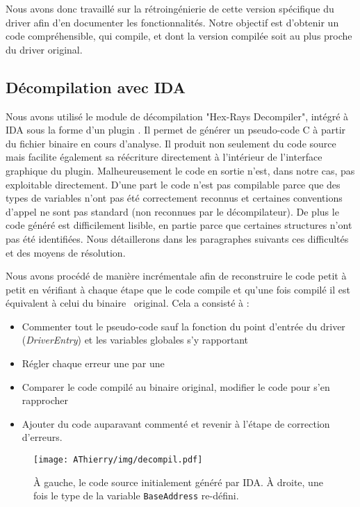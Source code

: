Nous avons donc travaillé sur la rétroingénierie de cette version spécifique du driver afin d'en documenter les fonctionnalités.
Notre objectif est d'obtenir un code compréhensible, qui compile, et dont la version compilée soit au plus proche du driver original.


\subsection{Décompilation avec IDA}
Nous avons utilisé le module de décompilation "Hex-Rays Decompiler", intégré à IDA sous la forme d'un plugin \cite{AThierry_IDADecompiler}. Il permet de générer un pseudo-code C à partir du fichier binaire en cours d'analyse. Il produit non seulement du code source mais facilite également sa réécriture directement à l'intérieur de l'interface graphique du plugin. %
Malheureusement le code en sortie n'est, dans notre cas, pas exploitable directement. D'une part le code n'est pas compilable parce que des types de variables n'ont pas été correctement reconnus et certaines conventions d'appel ne sont pas standard (non reconnues par le décompilateur). De plus le code généré est difficilement lisible, en partie parce que certaines structures n'ont pas été identifiées. Nous détaillerons dans les paragraphes suivants ces difficultés et des moyens de résolution.

Nous avons procédé de manière incrémentale afin de reconstruire le code petit à petit en vérifiant à chaque étape que le code compile et qu'une fois compilé il est équivalent à celui du binaire \driver\ original. 
Cela a consisté à :
\begin{itemize}
 \item Commenter tout le pseudo-code sauf la fonction du point d'entrée du driver (\emph{DriverEntry}) et les variables globales s'y rapportant
 \item Régler chaque erreur une par une
 \item Comparer le code compilé au binaire original, modifier le code pour s'en rapprocher
 \item Ajouter du code auparavant commenté et revenir à l'étape de correction d'erreurs.
\end{itemize}

\begin{figure}
\begin{changemargin}{-0cm}{-0cm}
\texttt{[image: AThierry/img/decompil.pdf]}
\end{changemargin}
\caption{À gauche, le code source initialement généré par IDA. À droite, une fois le type de la variable \texttt{BaseAddress} re-défini.}
\label{fig:AThierry_decompil}
\end{figure}

